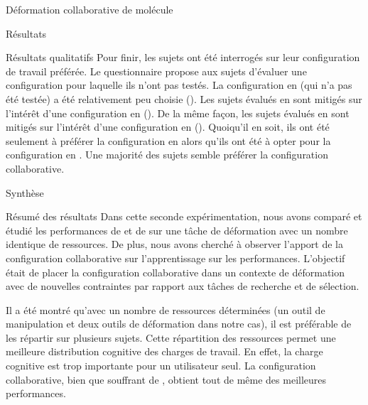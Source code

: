 \documentclass[myfrancais]{mythesis}
\begin{document}
\begin{mychapter}{Déformation collaborative de molécule}
\begin{mysection}{Résultats}
\begin{mysubsection}{Résultats qualitatifs}
				Pour finir, les sujets ont été interrogés sur leur configuration de travail préférée.
				Le questionnaire propose aux sujets d'évaluer une configuration pour laquelle ils n'ont pas testés.
				La configuration  en  (qui n'a pas été testée) a été relativement peu choisie ().
				Les sujets évalués en  sont mitigés sur l'intérêt d'une configuration  en  ().
				De la même façon, les sujets évalués en  sont mitigés sur l'intérêt d'une configuration  en  ().
				Quoiqu'il en soit, ils ont été seulement  à préférer la configuration  en  alors qu'ils ont été  à opter pour la configuration  en .
				Une majorité des sujets semble préférer la configuration collaborative.
			\end{mysubsection}
		\end{mysection}
		\begin{mysection}{Synthèse}
			\begin{mysubsection}{Résumé des résultats}
				Dans cette seconde expérimentation, nous avons comparé et étudié les performances de  et de  sur une tâche de déformation avec un nombre identique de ressources.
				De plus, nous avons cherché à observer l'apport de la configuration collaborative sur l'apprentissage sur les performances.
				L'objectif était de placer la configuration collaborative dans un contexte de déformation avec de nouvelles contraintes par rapport aux tâches de recherche et de sélection.

				Il a été montré qu'avec un nombre de ressources déterminées (un outil de manipulation et deux outils de déformation dans notre cas), il est préférable de les répartir sur plusieurs sujets.
				Cette répartition des ressources permet une meilleure distribution cognitive des charges de travail.
				En effet, la charge cognitive est trop importante pour un utilisateur seul.
				La configuration collaborative, bien que souffrant de , obtient tout de même des meilleures performances.


\end{mysubsection}
\end{mysection}
\end{mychapter}
\end{document}
